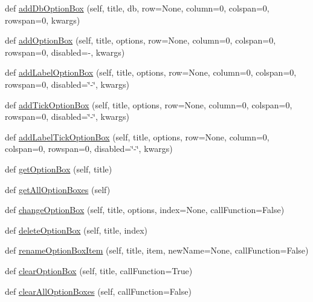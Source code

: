 \begin{DoxyCompactItemize}
\item 
def \hyperlink{class_python_01_g_u_i_1_1appjar_1_1gui_acf9b4b332eec8e36c03273dd8c2afc0d}{add\+Db\+Option\+Box} (self, title, db, row=None, column=0, colspan=0, rowspan=0, kwargs)
\item 
def \hyperlink{class_python_01_g_u_i_1_1appjar_1_1gui_a5dad85912393d493590c816a1a7cb29e}{add\+Option\+Box} (self, title, options, row=None, column=0, colspan=0, rowspan=0, disabled=\textquotesingle{}-\/\textquotesingle{}, kwargs)
\item 
def \hyperlink{class_python_01_g_u_i_1_1appjar_1_1gui_adcce641b50aca592f695b6ffa16fc9f8}{add\+Label\+Option\+Box} (self, title, options, row=None, column=0, colspan=0, rowspan=0, disabled=\char`\"{}-\/\char`\"{}, kwargs)
\item 
def \hyperlink{class_python_01_g_u_i_1_1appjar_1_1gui_a2c331e366fb743ffb44e4b1ae6662a45}{add\+Tick\+Option\+Box} (self, title, options, row=None, column=0, colspan=0, rowspan=0, disabled=\char`\"{}-\/\char`\"{}, kwargs)
\item 
def \hyperlink{class_python_01_g_u_i_1_1appjar_1_1gui_a65a800d7e00e321b33ebcd27d000fb3d}{add\+Label\+Tick\+Option\+Box} (self, title, options, row=None, column=0, colspan=0, rowspan=0, disabled=\char`\"{}-\/\char`\"{}, kwargs)
\item 
def \hyperlink{class_python_01_g_u_i_1_1appjar_1_1gui_ac0fd08d8e4dab5b50559b5a20a52dba0}{get\+Option\+Box} (self, title)
\item 
def \hyperlink{class_python_01_g_u_i_1_1appjar_1_1gui_a898fb61c477d42d989ad054f045376df}{get\+All\+Option\+Boxes} (self)
\item 
def \hyperlink{class_python_01_g_u_i_1_1appjar_1_1gui_a95d775949847e150b567e7df0ef2e256}{change\+Option\+Box} (self, title, options, index=None, call\+Function=False)
\item 
def \hyperlink{class_python_01_g_u_i_1_1appjar_1_1gui_a9caf0a5f5d9f13fe2ef2222fc54b47ce}{delete\+Option\+Box} (self, title, index)
\item 
def \hyperlink{class_python_01_g_u_i_1_1appjar_1_1gui_a7bd54bc6c78e5c08922f875232000aa8}{rename\+Option\+Box\+Item} (self, title, item, new\+Name=None, call\+Function=False)
\item 
def \hyperlink{class_python_01_g_u_i_1_1appjar_1_1gui_a2e43ed5ad69b9c005e03c0ead3f2ee55}{clear\+Option\+Box} (self, title, call\+Function=True)
\item 
def \hyperlink{class_python_01_g_u_i_1_1appjar_1_1gui_aad4073f6eb5a988b8f6e64d4f355ebd0}{clear\+All\+Option\+Boxes} (self, call\+Function=False)

\end{DoxyCompactItemize}
